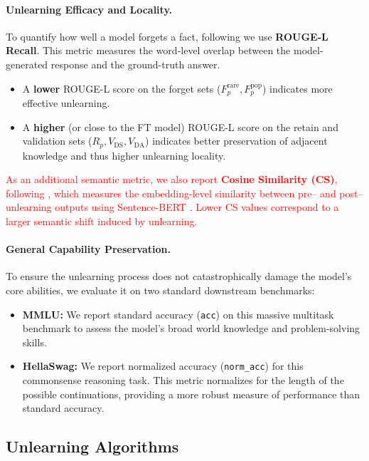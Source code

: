 \documentclass[sigconf,anonymous]{aamas}
\begin{document}
\paragraph{Unlearning Efficacy and Locality.}
To quantify how well a model forgets a fact, following \cite{lin2004rouge, geng2025comprehensive} we use \textbf{ROUGE-L Recall}. This metric measures the word-level overlap between the model-generated response and the ground-truth answer.
\begin{itemize}
    \item A \textbf{lower} ROUGE-L score on the forget sets ($F_p^{\text{rare}}, F_p^{\text{pop}}$) indicates more effective unlearning.
    \item A \textbf{higher} (or close to the FT model) ROUGE-L score on the retain and validation sets ($R_p, V_{\text{DS}}, V_{\text{DA}}$) indicates better preservation of adjacent knowledge and thus higher unlearning locality.
\end{itemize}

\textcolor{red}{
As an additional semantic metric, we also report \textbf{Cosine Similarity (CS)}, following \cite{yuan2024closer}, which measures the embedding-level similarity between pre– and post–unlearning outputs using Sentence-BERT \cite{reimers2019sentence}. Lower CS values correspond to a larger semantic shift induced by unlearning.
}

\paragraph{General Capability Preservation.}
To ensure the unlearning process does not catastrophically damage the model's core abilities, we evaluate it on two standard downstream benchmarks:
\begin{itemize}
    \item \textbf{MMLU:} We report standard accuracy (\texttt{acc}) on this massive multitask benchmark to assess the model's broad world knowledge and problem-solving skills.
    \item \textbf{HellaSwag:} We report normalized accuracy (\texttt{norm\_acc}) for this commonsense reasoning task. This metric normalizes for the length of the possible continuations, providing a more robust measure of performance than standard accuracy.
\end{itemize}


\subsection{Unlearning Algorithms} %
\label{sec:train}
\end{document}
